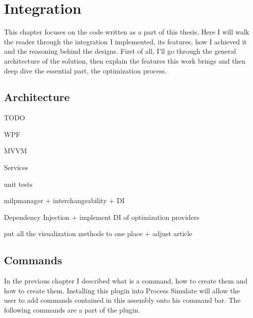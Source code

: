 \chapter{Integration}
\label{ch:integration}
\graphicspath{{chapters/Integration/}}

This chapter focuses on the code written as a part of this thesis. Here I will walk the reader through the integration I implemented, its features, how I achieved it and the reasoning behind the designs. First of all, I'll go through the general architecture of the solution, then explain the features this work brings and then deep dive the essential part, the optimization process.

\section{Architecture}

TODO
 
WPF

MVVM

Services

unit tests

milpmanager + interchangeability + DI

Dependency Injection + implement DI of optimization providers

put all the visualization methods to one place + adjust article

\section{Commands}

In the previous chapter I described what is a command, how to create them and how to create them. Installing this plugin into Process Simulate will allow the user to add commands contained in this assembly onto his command bar. The following commands are a part of the plugin.

